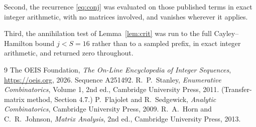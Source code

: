 \documentclass[11pt,a4paper]{article}
\theoremstyle{plain}
\theoremstyle{definition}
\begin{document}
Second, the recurrence \eqref{eq:conj} was evaluated on those published terms in exact
integer arithmetic, with no matrices involved, and vanishes wherever it applies.

Third, the annihilation test of Lemma~\ref{lem:crit} was run to the full Cayley--Hamilton
bound $j<S=16$ rather than to a sampled prefix, in exact integer arithmetic, and returned
zero throughout.

\begin{thebibliography}{9}
 The OEIS Foundation, \emph{The On-Line Encyclopedia of Integer
Sequences}, \url{https://oeis.org}, 2026. Sequence A251492.
 R.~P.~Stanley, \emph{Enumerative Combinatorics}, Volume 1, 2nd ed.,
Cambridge University Press, 2011. (Transfer-matrix method, Section 4.7.)
 P.~Flajolet and R.~Sedgewick, \emph{Analytic Combinatorics}, Cambridge
University Press, 2009.
 R.~A.~Horn and C.~R.~Johnson, \emph{Matrix Analysis}, 2nd ed., Cambridge
University Press, 2013.
\end{thebibliography}
\end{document}
